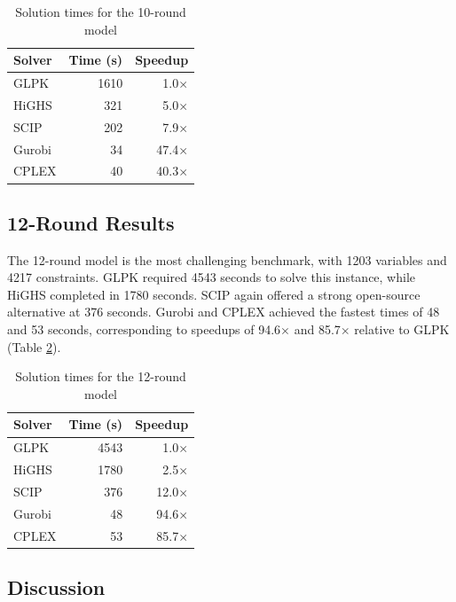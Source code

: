 \begin{table}[H]
  \centering
  \caption{Solution times for the 10-round model }
  \label{tab:10round}
  \begin{tabular}{lrr}
    \toprule
    Solver  & Time (s) & Speedup \\
    \midrule
    GLPK   & 1610 & 1.0$\times$ \\
    HiGHS  & 321  & 5.0$\times$ \\
    SCIP   & 202  & 7.9$\times$ \\
    Gurobi & 34   & 47.4$\times$ \\
    CPLEX  & 40   & 40.3$\times$ \\
    \bottomrule
  \end{tabular}
\end{table}

\subsection{12-Round Results}

The 12-round model is the most challenging benchmark, with 1203 variables and 4217 constraints. GLPK required 4543 seconds to solve this instance, while HiGHS completed in 1780 seconds. SCIP again offered a strong open-source alternative at 376 seconds. Gurobi and CPLEX achieved the fastest times of 48 and 53 seconds, corresponding to speedups of 94.6$\times$ and 85.7$\times$ relative to GLPK (Table \ref{tab:12round}).

\begin{table}[H]
  \centering
  \caption{Solution times for the 12-round model}
  \label{tab:12round}
  \begin{tabular}{lrr}
    \toprule
    Solver  & Time (s) & Speedup \\
    \midrule
    GLPK   & 4543 & 1.0$\times$ \\
    HiGHS  & 1780 & 2.5$\times$ \\
    SCIP   & 376  & 12.0$\times$ \\
    Gurobi & 48   & 94.6$\times$ \\
    CPLEX  & 53   & 85.7$\times$ \\
    \bottomrule
  \end{tabular}
\end{table}

\subsection{Discussion}

